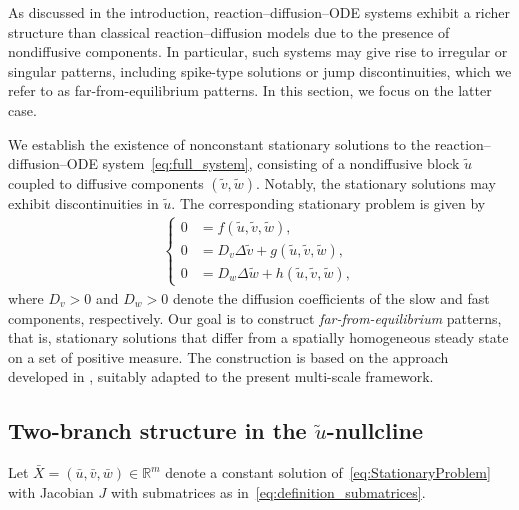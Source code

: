 \documentclass[12pt, a4paper]{amsart}
\numberwithin{equation}{section}
\newcommand{\RR}{\mathbb{R}}
\newcommand{\CSS}{\bar{X}}
\newcommand{\Cun}{\bar{\un}}
\newcommand{\Cus}{\bar{\us}}
\newcommand{\Cuf}{\bar{\uf}}
\newcommand{\Nun}{\tilde{\un}}
\newcommand{\Nus}{\tilde{\us}}
\newcommand{\Nuf}{\tilde{\uf}}
\newcommand{\un}{u}
\newcommand{\us}{v}
\newcommand{\uf}{w}
\newcommand{\Ds}{D_v}
\newcommand{\Df}{D_w}
\newcommand{\fn}{f}
\newcommand{\fs}{g}
\newcommand{\ffa}{h}
\newenvironment{nalign}
{\begin{equation}\begin{aligned}}
		{\end{aligned}\end{equation}\ignorespacesafterend}
\begin{document}
As discussed in the introduction, reaction--diffusion--ODE systems exhibit a richer structure than classical reaction--diffusion models due to the presence of nondiffusive components.
In particular, such systems may give rise to irregular or singular patterns, including spike-type solutions or jump discontinuities, which we refer to as far-from-equilibrium patterns.
In this section, we focus on the latter case.

We establish the existence of nonconstant stationary solutions to the reaction--diffusion--ODE system~\eqref{eq:full_system}, consisting of a nondiffusive block $\Nun$ coupled to diffusive components $(\Nus, \Nuf)$. Notably, the stationary solutions may exhibit discontinuities in $\Nun$. The corresponding stationary problem is given by
\begin{nalign}
\label{eq:StationaryProblem}
\left\{
\begin{aligned}
    0 &= \fn(\Nun,\Nus, \Nuf),\\
    0 &= \Ds \Delta \Nus + \fs(\Nun,\Nus, \Nuf), \\
    0 &= \Df \Delta \Nuf + \ffa(\Nun,\Nus, \Nuf),
\end{aligned}
\right.
\end{nalign}
where $\Ds > 0$ and $\Df > 0$ denote the diffusion coefficients of the slow and fast components, respectively.
Our goal is to construct \emph{far-from-equilibrium} patterns, that is, stationary solutions that differ from a spatially homogeneous steady state on a set of positive measure. The construction is based on the approach developed in \cite{Cygan2023}, suitably adapted to the present multi-scale framework.

\subsection{Two-branch structure in the \texorpdfstring{$\Nun$}{u}-nullcline}
Let $\CSS = (\Cun,\Cus,\Cuf)\in\RR^m$ denote a constant 
solution of~\eqref{eq:StationaryProblem} with Jacobian $J$ with submatrices as in~\eqref{eq:definition_submatrices}.
\end{document}
